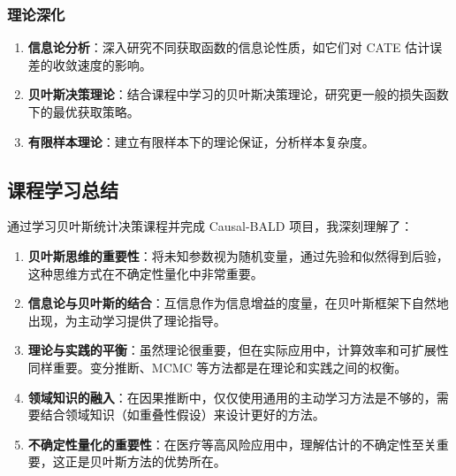 \documentclass[12pt]{article}
\begin{document}
\subsubsection{理论深化}

\begin{enumerate}
\item \textbf{信息论分析}：深入研究不同获取函数的信息论性质，如它们对 CATE 估计误差的收敛速度的影响。

\item \textbf{贝叶斯决策理论}：结合课程中学习的贝叶斯决策理论，研究更一般的损失函数下的最优获取策略。

\item \textbf{有限样本理论}：建立有限样本下的理论保证，分析样本复杂度。
\end{enumerate}

\subsection{课程学习总结}

通过学习贝叶斯统计决策课程并完成 Causal-BALD 项目，我深刻理解了：

\begin{enumerate}
\item \textbf{贝叶斯思维的重要性}：将未知参数视为随机变量，通过先验和似然得到后验，这种思维方式在不确定性量化中非常重要。

\item \textbf{信息论与贝叶斯的结合}：互信息作为信息增益的度量，在贝叶斯框架下自然地出现，为主动学习提供了理论指导。

\item \textbf{理论与实践的平衡}：虽然理论很重要，但在实际应用中，计算效率和可扩展性同样重要。变分推断、MCMC 等方法都是在理论和实践之间的权衡。

\item \textbf{领域知识的融入}：在因果推断中，仅仅使用通用的主动学习方法是不够的，需要结合领域知识（如重叠性假设）来设计更好的方法。

\item \textbf{不确定性量化的重要性}：在医疗等高风险应用中，理解估计的不确定性至关重要，这正是贝叶斯方法的优势所在。
\end{enumerate}
\end{document}
